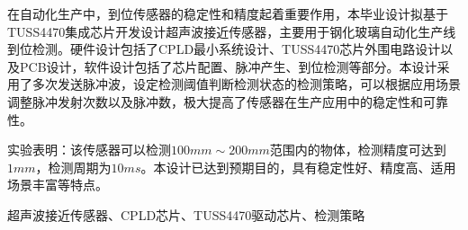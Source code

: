 \begin{ZhAbstract}
    在自动化生产中，到位传感器的稳定性和精度起着重要作用，本毕业设计拟基于TUSS4470集成芯片开发设计超声波接近传感器，主要用于钢化玻璃自动化生产线到位检测。硬件设计包括了CPLD最小系统设计、TUSS4470芯片外围电路设计以及PCB设计，软件设计包括了芯片配置、脉冲产生、到位检测等部分。本设计采用了多次发送脉冲波，设定检测阈值判断检测状态的检测策略，可以根据应用场景调整脉冲发射次数以及脉冲数，极大提高了传感器在生产应用中的稳定性和可靠性。\par
    实验表明：该传感器可以检测$100mm\sim200mm$范围内的物体，检测精度可达到$1mm$，检测周期为$10ms$。本设计已达到预期目的，具有稳定性好、精度高、适用场景丰富等特点。
    
    \ChineseKeyWord 超声波接近传感器、CPLD芯片、TUSS4470驱动芯片、检测策略
    
\end{ZhAbstract}